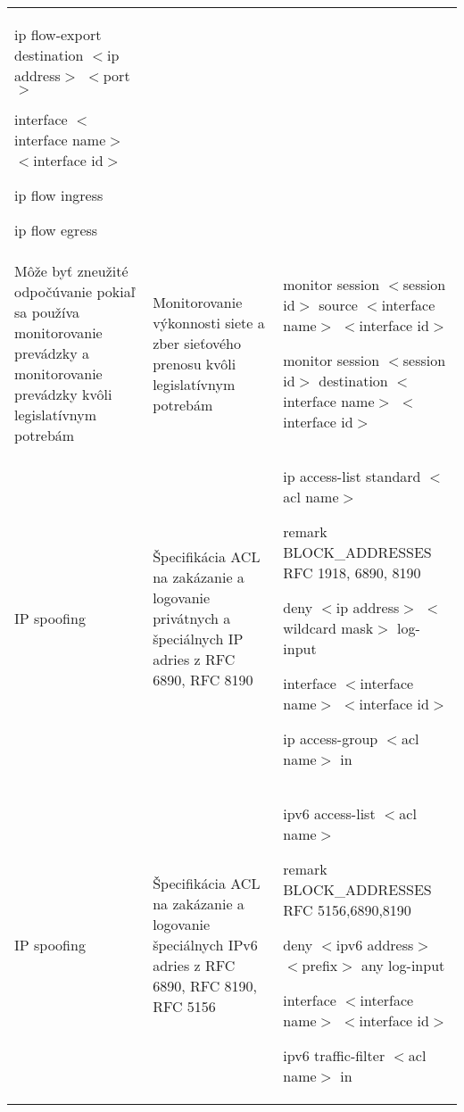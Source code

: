 \begin{longtable}[!htbp]{|L{10em}L{10em}>{\selectfont}L{34em}|}
	
	ip flow-export destination $<$ip address$>$ $<$port$>$
	
	interface $<$interface name$>$ $<$interface id$>$
	
	\hspace{0.5em}ip flow ingress
	
	\hspace{0.5em}ip flow egress\\
	
	
	
	
	 Môže byť zneužité odpočúvanie pokiaľ sa používa monitorovanie prevádzky a monitorovanie prevádzky kvôli legislatívnym potrebám	&Monitorovanie výkonnosti siete a zber sieťového prenosu kvôli legislatívnym potrebám	&monitor session $<$session id$>$ source $<$interface name$>$ $<$interface id$>$
	
	monitor session $<$session id$>$ destination $<$interface name$>$ $<$interface id$>$\\
	
	
	
	
	IP spoofing	&Špecifikácia ACL na zakázanie a logovanie privátnych a špeciálnych IP adries z RFC 6890, RFC 8190	&ip access-list standard $<$acl name$>$
	
	\hspace{0.5em}remark BLOCK\_ADDRESSES RFC 1918, 6890, 8190
	
	\hspace{0.5em}deny $<$ip address$>$ $<$wildcard mask$>$ log-input
	
	interface $<$interface name$>$ $<$interface id$>$
	
	\hspace{0.5em}ip access-group $<$acl name$>$ in\\
	
	
	
	
	 IP spoofing	&Špecifikácia ACL na zakázanie a logovanie špeciálnych IPv6 adries z RFC 6890, RFC 8190, RFC 5156	&
	ipv6 access-list $<$acl name$>$
	
	\hspace{0.5em}remark BLOCK\_ADDRESSES RFC 5156,6890,8190
	
	\hspace{0.5em}deny $<$ipv6 address$>$ $<$prefix$>$ any log-input
	
	interface $<$interface name$>$ $<$interface id$>$
	
	\hspace{0.5em}ipv6 traffic-filter $<$acl name$>$ in\\
	

\end{longtable}
